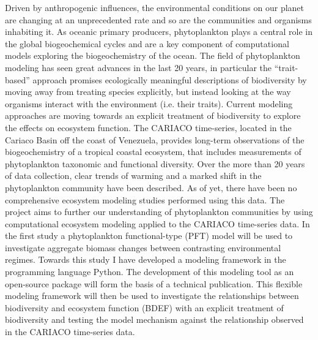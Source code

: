 \begin{titlepage}
Driven by anthropogenic influences, the environmental conditions on our planet are changing at an unprecedented rate and so are the communities and organisms inhabiting it. As oceanic primary producers, phytoplankton plays a central role in the global biogeochemical cycles and are a key component of computational models exploring the biogeochemistry of the ocean. The field of phytoplankton modeling has seen great advances in the last 20 years, in particular the “trait-based” approach promises ecologically meaningful descriptions of biodiversity by moving away from treating species explicitly, but instead looking at the way organisms interact with the environment (i.e. their traits). Current modeling approaches are moving towards an explicit treatment of biodiversity to explore the effects on ecosystem function. The CARIACO time-series, located in the Cariaco Basin off the coast of Venezuela, provides long-term observations of the biogeochemistry of a tropical coastal ecosystem, that includes measurements of phytoplankton taxonomic and functional diversity. Over the more than 20 years of data collection, clear trends of warming and a marked shift in the phytoplankton community have been described. As of yet, there have been no comprehensive ecosystem modeling studies performed using this data. The project aims to further our understanding of phytoplankton communities by using computational ecosystem modeling applied to the CARIACO time-series data. In the first study a phytoplankton functional-type (PFT) model will be used to investigate aggregate biomass changes between contrasting environmental regimes. Towards this study I have developed a modeling framework in the programming language Python. The development of this modeling tool as an open-source package will form the basis of a technical publication. This flexible modeling framework will then be used to investigate the relationships between biodiversity and ecosystem function (BDEF) with an explicit treatment of biodiversity and testing the model mechanism against the relationship observed in the CARIACO time-series data. 



  

\end{titlepage}